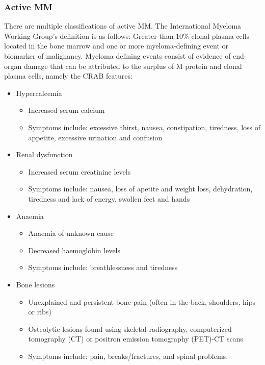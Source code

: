 \subsubsection{Active MM}
There are multiple classifications of active MM.
The International Myeloma Working Group's definition\cite{rajkumar2014international} is as follows:
Greater than 10\% clonal plasma cells located in the bone marrow and one or more myeloma-defining event or biomarker of malignancy.
Myeloma defining events consist of evidence of end-organ damage that can be attributed to the surplus of M protein and clonal plasma cells, namely the CRAB features:
%
\begin{itemize}
  \item Hypercalcemia
    \begin{itemize}
        \item Increased serum calcium
        \item Symptoms include: excessive thirst, nausea, constipation, tiredness, loss of appetite, excessive urination and confusion
    \end{itemize}
  \item Renal dysfunction
    \begin{itemize}
        \item Increased serum creatinine levels
        \item Symptoms include: nausea, loss of apetite and weight loss, dehydration, tiredness and lack of energy, swollen feet and hands
    \end{itemize}
  \item Anaemia
    \begin{itemize}
        \item Anaemia of unknown cause
        \item Decreased haemoglobin levels
        \item Symptoms include: breathlessness and tiredness
    \end{itemize}
    \item Bone lesions
      \begin{itemize}
        \item Unexplained and persistent bone pain (often in the back, shoulders, hips or ribs)
        \item Osteolytic lesions found using skeletal radiography, computerized tomography (CT) or positron emission tomography (PET)-CT scans
        \item Symptoms include: pain, breaks/fractures, and spinal problems.
      \end{itemize}
\end{itemize}
%

